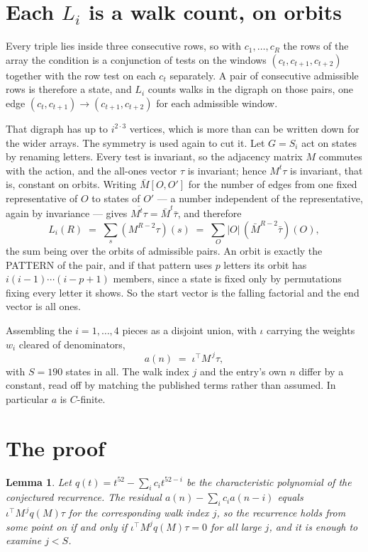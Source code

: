 \documentclass[11pt,a4paper]{article}
\theoremstyle{plain}
\newtheorem{lemma}[theorem]{Lemma}
\theoremstyle{definition}
\begin{document}
\section{Each $L_i$ is a walk count, on orbits}

Every triple lies inside three consecutive rows, so with $c_1,\dots,c_R$ the rows of the array
the condition is a conjunction of tests on the windows $(c_{t},c_{t+1},c_{t+2})$ together
with the row test on each $c_t$ separately. A pair of consecutive admissible rows is therefore
a state, and $L_i$ counts walks in the digraph on those pairs, one edge $(c_t,c_{t+1})\to
(c_{t+1},c_{t+2})$ for each admissible window.

That digraph has up to $i^{2\cdot3}$ vertices, which is more than can be written down for
the wider arrays. The symmetry is used again to cut it. Let $G=S_i$ act on states by renaming
letters. Every test is invariant, so the adjacency matrix $M$ commutes with the action, and the
all-ones vector $\tau$ is invariant; hence $M^{t}\tau$ is invariant, that is, constant on
orbits. Writing $\bar M[O,O']$ for the number of edges from one fixed representative of $O$ to
states of $O'$ --- a number independent of the representative, again by invariance --- gives
$\overline{M^{t}\tau}=\bar M^{t}\bar\tau$, and therefore
\[
L_i(R)\;=\;\sum_{s}(M^{R-2}\tau)(s)\;=\;\sum_{O}|O|\,(\bar M^{R-2}\bar\tau)(O),
\]
the sum being over the orbits of admissible pairs. An orbit is exactly the PATTERN of the pair,
and if that pattern uses $p$ letters its orbit has $i(i-1)\cdots(i-p+1)$ members, since a state
is fixed only by permutations fixing every letter it shows. So the start vector is the falling
factorial and the end vector is all ones.

Assembling the $i=1,\dots,4$ pieces as a disjoint union, with $\iota$ carrying the weights
$w_i$ cleared of denominators,
\[
a(n)\;=\;\iota^{\!\top}M^{\,j}\tau ,
\]
with $S=190$ states in all. The walk index $j$ and the entry's own $n$ differ by a constant,
read off by matching the published terms rather than assumed. In particular $a$ is $C$-finite.

\section{The proof}

\begin{lemma}\label{lem:crit}
Let $q(t)=t^{52}-\sum_i c_it^{52-i}$ be the characteristic polynomial of the
conjectured recurrence. The residual $a(n)-\sum_ic_ia(n-i)$ equals
$\iota^{\!\top}M^{\,j}q(M)\tau$ for the corresponding walk index $j$, so the recurrence
holds from some point on if and only if $\iota^{\!\top}M^{j}q(M)\tau=0$ for all large $j$,
and it is enough to examine $j<S$.
\end{lemma}
\end{document}

